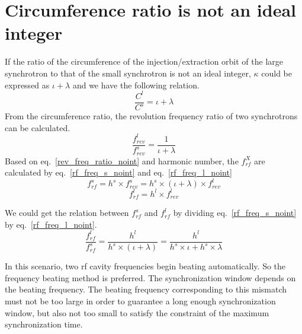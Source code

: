\section{ Circumference ratio is not an ideal integer}
If the ratio of the circumference of the injection/extraction orbit of the large synchrotron to that of the small synchrotron is not an ideal integer, $\kappa$ could be expressed as $\iota + \lambda$ and we have the following relation.
\begin{equation}
\frac{C^l}{C^s}=\iota + \lambda \label{circumference_ratio_noint}
\end{equation}
From the circumference ratio, the revolution frequency ratio of two synchrotrons can be calculated.
\begin{equation}
\frac{f_{rev}^{l}}{f_{rev}^{s}}=\frac{1}{\iota+ \lambda} \label{rev_freq_ratio_noint}
\end{equation}
Based on eq.~\ref{rev_freq_ratio_noint} and harmonic number, the $f_{rf}^{X}$ are calculated by eq.~\ref{rf_freq_s_noint} and eq.~\ref{rf_freq_l_noint}
\begin{equation} 
f_{rf}^{s}= h^s \times f_{rev}^{s}=h^s \times (\iota+ \lambda) \times f_{rev}^{l} \label{rf_freq_s_noint}
\end{equation}
\begin{equation} 
f_{rf}^{l}= h^l \times f_{rev}^{l} \label{rf_freq_l_noint}
\end{equation}

We could get the relation between $f_{rf}^{s}$ and $f_{rf}^{l}$ by dividing eq.~\ref{rf_freq_s_noint} by eq.~\ref{rf_freq_l_noint}.
\begin{equation} 
\frac{f_{rf}^{l}}{f_{rf}^{s}}=\frac{h^l}{h^s \times (\iota+ \lambda)}=\frac{h^l}{h^s \times \iota+ h^s \times \lambda}\label{close_to_interger_3}
\end{equation}

In this scenario, two rf cavity frequencies begin beating automatically. So the frequency beating method is preferred. The synchronization window depends on the beating frequency. The beating frequency corresponding to this mismatch must not be too large in order to guarantee a long enough synchronization window, but also not too small to satisfy the constraint of the maximum synchronization time.
